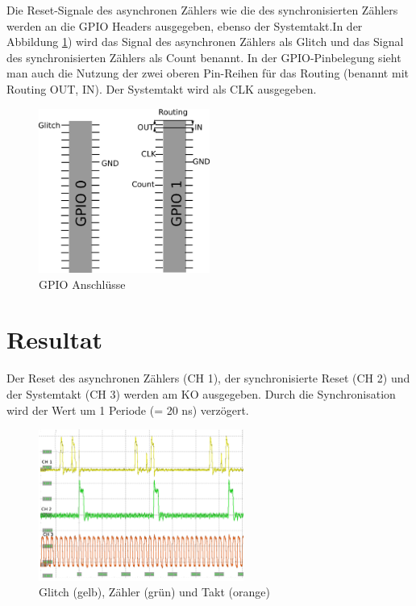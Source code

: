 Die Reset-Signale des asynchronen Zählers wie die des synchronisierten Zählers werden an die GPIO Headers ausgegeben, ebenso der Systemtakt.In der Abbildung \ref{fig.glitch.GPIO}) wird das Signal des asynchronen Zählers als Glitch und das Signal des synchronisierten Zählers als Count benannt. In der GPIO-Pinbelegung sieht man auch die Nutzung der zwei oberen Pin-Reihen für das Routing (benannt mit Routing OUT, IN). Der Systemtakt wird als CLK ausgegeben.
\begin{figure}[H]
	\includegraphics[width=0.5\textwidth]{images/glitch/GPIO_Belegung.png}
	\caption{GPIO Anschlüsse}
	\label{fig.glitch.GPIO}
\end{figure}


\newpage
\section{Resultat }\label{sect.glitch_resultat}

Der Reset des asynchronen Zählers (CH 1), der synchronisierte Reset (CH 2) und der Systemtakt (CH 3) werden am KO ausgegeben. Durch die Synchronisation wird der Wert um 1 Periode (= 20 ns) verzögert.

\begin{figure}[H]
	\includegraphics[width=0.6\textwidth]{images/glitch/Glitch_2_good.png}
	\caption{Glitch (gelb), Zähler (grün) und Takt (orange)}
	\label{fig.glitch.result_1}
\end{figure}

